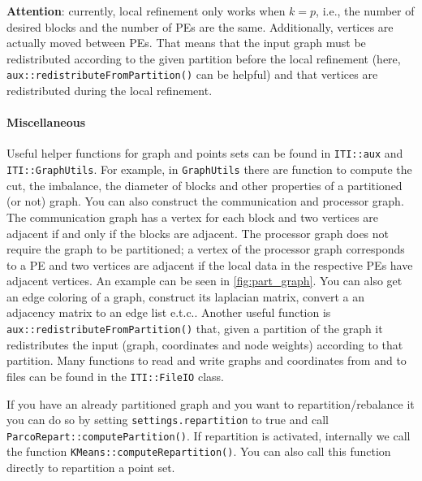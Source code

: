 \documentclass[a4paper,10pt]{article}
\newcommand{\etc}{e.t.c.}
\newcommand{\att}{\textbf{Attention}: }
\newcommand{\MI}[1]{\texttt{#1}}
\begin{document}
\att currently, local refinement only works when $k=p$, i.e., the number of desired blocks and the
number of PEs are the same. Additionally, vertices are actually moved between PEs. That means
that the input graph must be redistributed according to the given partition before the local refinement
(here, \MI{aux::redistributeFromPartition()} can be helpful)
and that vertices are redistributed during the local refinement.

\paragraph{Miscellaneous}
Useful helper functions for graph and points sets can be found in \MI{ITI::aux}
and \MI{ITI::GraphUtils}. For example, in \MI{GraphUtils} there are function to compute the cut,
the imbalance, the diameter of blocks and other properties of a partitioned (or not) graph.
You can also construct the communication and processor graph.
The communication graph has a vertex for each block and two vertices
are adjacent if and only if the blocks are adjacent. The processor graph does not require the graph
to be partitioned; a vertex of the processor graph corresponds to a PE and two vertices are adjacent 
if the local data in the respective PEs have adjacent vertices. An example can be seen in
\cref{fig:part_graph}. You can also get an edge coloring of a graph,
construct its laplacian matrix, convert a an adjacency matrix to an edge list \etc.
Another useful function is \MI{aux::redistributeFromPartition()} that, given a partition of the graph 
it redistributes the input (graph, coordinates and node weights) according to that partition.
Many functions to read and write graphs and coordinates from and to files can be found
in the \MI{ITI::FileIO} class.

If you have an already partitioned graph and you want to repartition/rebalance it you can do
so by setting \MI{settings.repartition} to true and call \MI{ParcoRepart::computePartition()}.
If repartition is activated, internally we call the function \MI{KMeans::computeRepartition()}.
You can also call this function directly to repartition a point set.
\end{document}
